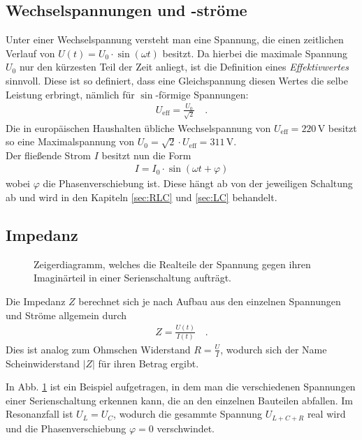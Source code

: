 \documentclass[12pt,a4paper,titlepage,headinclude,bibtotoc]{scrartcl}
\begin{document}
\subsection{Wechselspannungen und -ströme}
Unter einer Wechselspannung versteht man eine Spannung, die einen zeitlichen Verlauf von $U(t)= U_0\cdot\sin(\omega t)$ besitzt.
Da hierbei die maximale Spannung $U_0$ nur den kürzesten Teil der Zeit anliegt, ist die Definition eines \emph{Effektivwertes} sinnvoll.
Diese ist so definiert, dass eine Gleichspannung diesen Wertes die selbe Leistung erbringt, nämlich für $\sin$-förmige Spannungen:
\begin{align*}
U_\text{eff}=\frac{U_0}{\sqrt2}\quad .
\end{align*}
Die in europäischen Haushalten übliche Wechselspannung von $U_\text{eff}=220\,\si\volt$ besitzt so eine Maximalspannung von $U_0=\sqrt2\cdot U_\text{eff}=311\,\si\volt$.\\

Der fließende Strom $I$ besitzt nun die Form
\begin{align*}
I=I_0\cdot\sin(\omega t+\varphi)
\end{align*}
wobei $\varphi$ die Phasenverschiebung ist.
Diese hängt ab von der jeweiligen Schaltung ab und wird in den Kapiteln \ref{sec:RLC} und \ref{sec:LC} behandelt.

\subsection{Impedanz}
\begin{figure}[!h]
\centering

\caption{Zeigerdiagramm, welches die Realteile der Spannung gegen ihren Imaginärteil in einer Serienschaltung aufträgt.}
\label{fig:zeiger}
\end{figure}
Die Impedanz $Z$ berechnet sich je nach Aufbau aus den einzelnen Spannungen und Ströme allgemein durch
\begin{align}
Z=\frac{U(t)}{I(t)}\quad .
\end{align}
Dies ist analog zum Ohmschen Widerstand $R=\frac{U}{I}$, wodurch sich der Name Scheinwiderstand $|Z|$ für ihren Betrag ergibt.

In Abb. \ref{fig:zeiger} ist ein Beispiel aufgetragen, in dem man die verschiedenen Spannungen einer Serienschaltung erkennen kann, die an den einzelnen Bauteilen abfallen.
Im Resonanzfall ist $U_L=U_C$, wodurch die gesammte Spannung $U_{L+C+R}$ real wird und die Phasenverschiebung $\varphi=0$ verschwindet.
\end{document}

